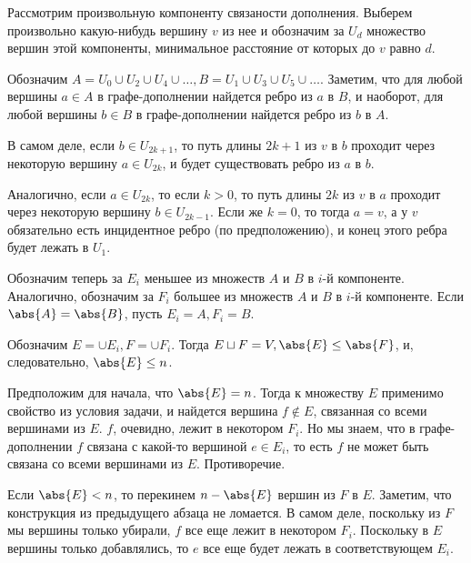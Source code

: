 	Рассмотрим произвольную компоненту связаности дополнения. Выберем произвольно какую-нибудь вершину $v$ из нее и обозначим за $U_d$ множество вершин этой компоненты, минимальное расстояние от которых до $v$ равно $d$.

	Обозначим $A = U_0 \cup U_2 \cup U_4 \cup \dots, B = U_1 \cup U_3 \cup U_5 \cup \dots$. Заметим, что для любой вершины $a \in A$ в графе-дополнении найдется ребро из $a$ в $B$, и наоборот, для любой вершины $b \in B$ в графе-дополнении найдется ребро из $b$ в $A$.

	В самом деле, если $b \in U_{2k+1}$, то путь длины $2k+1$ из $v$ в $b$ проходит через некоторую вершину $a \in U_{2k}$, и будет существовать ребро из $a$ в $b$.

	Аналогично, если $a \in U_{2k}$, то если $k > 0$, то путь длины $2k$ из $v$ в $a$ проходит через некоторую вершину $b \in U_{2k-1}$. Если же $k = 0$, то тогда $a = v$, а у $v$ обязательно есть инцидентное ребро (по предположению), и конец этого ребра будет лежать в $U_1$.

	Обозначим теперь за $E_i$ меньшее из множеств $A$ и $B$ в $i$-й компоненте. Аналогично, обозначим за $F_i$ большее из множеств $A$ и $B$ в $i$-й компоненте. Если $\abs{A} = \abs{B}$, пусть $E_i = A, F_i = B$.

	Обозначим $E = \cup E_i, F = \cup F_i$. Тогда $E \sqcup F = V, \abs{E} \le \abs{F}$, и, следовательно, $\abs{E} \le n$.

	Предположим для начала, что $\abs{E} = n$. Тогда к множеству $E$ применимо свойство из условия задачи, и найдется вершина $f \not\in E$, связанная со всеми вершинами из $E$. $f$, очевидно, лежит в некотором $F_i$. Но мы знаем, что в графе-дополнении $f$ связана с какой-то вершиной $e \in E_i$, то есть $f$ не может быть связана со всеми вершинами из $E$. Противоречие.

	Если $\abs{E} < n$, то перекинем $n - \abs{E}$ вершин из $F$ в $E$. Заметим, что конструкция из предыдущего абзаца не ломается. В самом деле, поскольку из $F$ мы вершины только убирали, $f$ все еще лежит в некотором $F_i$. Поскольку в $E$ вершины только добавлялись, то $e$ все еще будет лежать в соответствующем $E_i$. 

